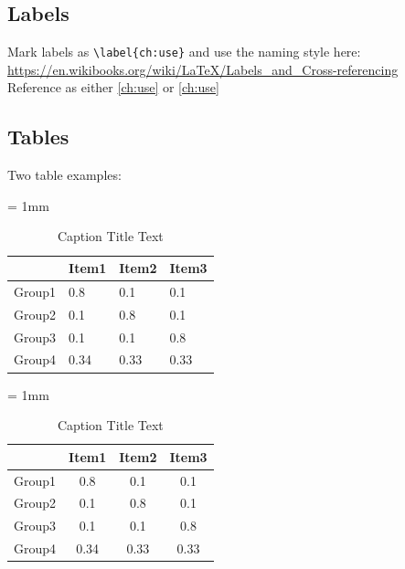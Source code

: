 \subsection{Labels}
Mark labels as \verb|\label{ch:use}| and use the naming style here:\\ \url{https://en.wikibooks.org/wiki/LaTeX/Labels_and_Cross-referencing} \\
Reference as either \ref{ch:use} or \eqref{ch:use}


\subsection{Tables}
Two table examples:

\begin{table}[H] %
  \vspace{1cm}
  \centering
  \extrarowsep = 1mm
  \begin{tabu} to .6\linewidth { | X[-2,lm] | X[-1,c]  X[-1,c]  X[-1,c] | }
     & Item1 & Item2 & Item3 \\
    \hline
    Group1 & 0.8   & 0.1   & 0.1  \\
    Group2 & 0.1   & 0.8   & 0.1  \\
    Group3 & 0.1   & 0.1   & 0.8  \\
    \hline
    Group4 & 0.34  & 0.33  & 0.33 \\
    \hline
  \end{tabu}
  \caption[Table Title as Appears in TOC]{Caption Title Text}
  \label{tab:table1label}
\end{table}

\begin{table}[H] %
\vspace{1cm}
  \centering
  \extrarowsep = 1mm
  \begin{tabu}{cccc}
    \toprule
      & Item1 & Item2 & Item3 \\ \midrule
    Group1 & 0.8   & 0.1   & 0.1  \\
    Group2 & 0.1   & 0.8   & 0.1  \\
    Group3 & 0.1   & 0.1   & 0.8  \\
    Group4 & 0.34  & 0.33  & 0.33 \\ \bottomrule
  \end{tabu}
  \caption[Table Title as Appears in TOC]{Caption Title Text}
  \label{tab:table2label}
\end{table}


